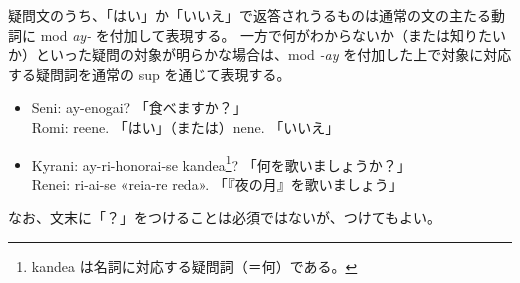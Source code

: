 疑問文のうち、「はい」か「いいえ」で返答されうるものは通常の文の主たる動詞に mod \emph{ay-} を付加して表現する。
一方で何がわからないか（または知りたいか）といった疑問の対象が明らかな場合は、mod \emph{-ay} を付加した上で対象に対応する疑問詞を通常の sup を通じて表現する。

\begin{itemize}
    \item Seni: ay-enogai? 「食べますか？」 \\ Romi: reene. 「はい」（または）nene. 「いいえ」
    \item Kyrani: ay-ri-honorai-se kandea\footnote{kandea は名詞に対応する疑問詞（＝何）である。}? 「何を歌いましょうか？」\\ Renei: ri-ai-se «reia-re reda». 「『夜の月』を歌いましょう」
\end{itemize}

なお、文末に「？」をつけることは必須ではないが、つけてもよい。